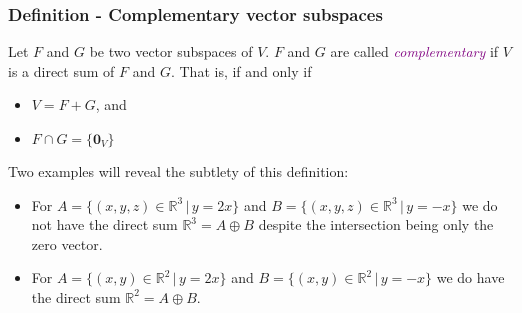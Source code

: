 \documentclass[usenames,dvipsnames,aspectratio=169,10pt]{beamer}
\numberwithin{equation}{section}
\begin{document}
\begin{frame}
\frametitle{Definition - Complementary vector subspaces}

Let $F$ and $G$ be two vector subspaces of $V$. $F$ and $G$ are called \textcolor{Purple}{\textit{complementary}} if $V$ is a direct sum of $F$ and $G$. That is, if and only if
\begin{itemize}
\item $V = F+G$, and
\item $F \cap G = \{\textbf{0}_V \}$
\end{itemize}

Two examples will reveal the subtlety of this definition:
\begin{itemize}
\item For $A=\{ (x,y,z)\in \mathbb{R}^3 \, | \, y=2x \}$ and $B=\{ (x,y,z)\in \mathbb{R}^3 \, | \, y=-x \}$ we do not have the direct sum $\mathbb{R}^3=A \oplus B$ despite the intersection being only the zero vector.

\item For $A=\{ (x,y)\in \mathbb{R}^2 \, | \, y=2x \}$ and $B=\{ (x,y)\in \mathbb{R}^2 \, | \, y=-x \}$ we do have the direct sum $\mathbb{R}^2=A \oplus B$.
\end{itemize}


\end{frame}

\end{document}
